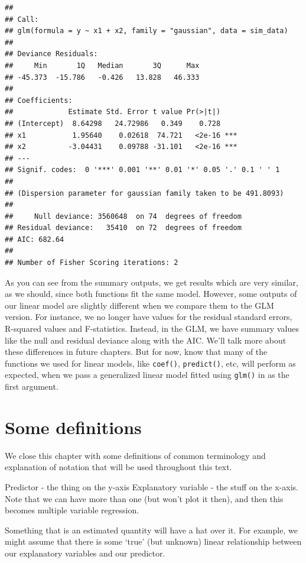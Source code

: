 \documentclass[
]{book}
\begin{document}
\begin{verbatim}
## 
## Call:
## glm(formula = y ~ x1 + x2, family = "gaussian", data = sim_data)
## 
## Deviance Residuals: 
##     Min       1Q   Median       3Q      Max  
## -45.373  -15.786   -0.426   13.828   46.333  
## 
## Coefficients:
##             Estimate Std. Error t value Pr(>|t|)    
## (Intercept)  8.64298   24.72986   0.349    0.728    
## x1           1.95640    0.02618  74.721   <2e-16 ***
## x2          -3.04431    0.09788 -31.101   <2e-16 ***
## ---
## Signif. codes:  0 '***' 0.001 '**' 0.01 '*' 0.05 '.' 0.1 ' ' 1
## 
## (Dispersion parameter for gaussian family taken to be 491.8093)
## 
##     Null deviance: 3560648  on 74  degrees of freedom
## Residual deviance:   35410  on 72  degrees of freedom
## AIC: 682.64
## 
## Number of Fisher Scoring iterations: 2
\end{verbatim}

As you can see from the summary outputs, we get results which are very similar, as we should, since both functions fit the same model. However, some outputs of our linear model are slightly different when we compare them to the GLM version. For instance, we no longer have values for the residual standard errors, R-squared values and F-statistics. Instead, in the GLM, we have summary values like the null and residual deviance along with the AIC. We'll talk more about these differences in future chapters. But for now, know that many of the functions we used for linear models, like \texttt{coef()}, \texttt{predict()}, etc, will perform as expected, when we pass a generalized linear model fitted using \texttt{glm()} in as the first argument.

\hypertarget{definitions}{%
\section{Some definitions}\label{definitions}}

We close this chapter with some definitions of common terminology and explanation of notation that will be used throughout this text.

Predictor - the thing on the y-axis
Explanatory variable - the stuff on the x-axis. Note that we can have more than one (but won't plot it then), and then this becomes multiple variable regression.

Something that is an estimated quantity will have a hat over it.
For example, we might assume that there is some `true' (but unknown) linear relationship between our explanatory variables and our predictor.
\end{document}
